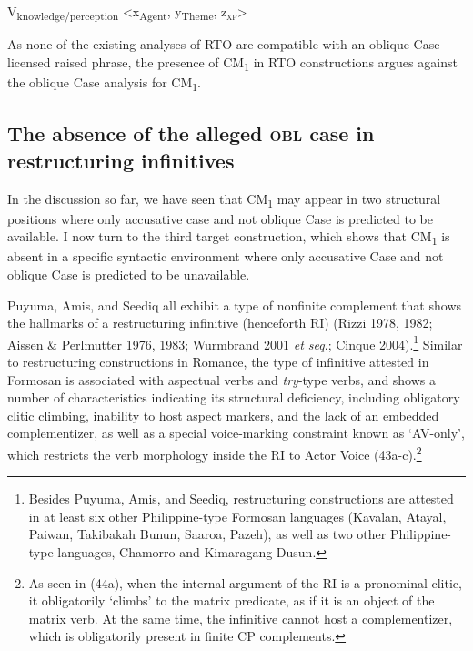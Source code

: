 \documentclass[10pt]{article}
\begin{document}
\begin{exe}
\ex V\textsubscript{knowledge/perception} <x\textsubscript{Agent}, y\textsubscript{Theme}, z\textsubscript{\textsc{xp}}>
\end{exe}

As none of the existing analyses of RTO are compatible with an oblique Case-licensed raised phrase, the presence of CM\textsubscript{1} in RTO constructions argues against the oblique Case analysis for CM\textsubscript{1}.


\subsection{The absence of the alleged \textsc{obl} case in restructuring infinitives}

\noindent In the discussion so far, we have seen that CM\textsubscript{1} may appear in two structural positions where only accusative case and not oblique Case is predicted to be available. I now turn to the third target construction, which shows that CM\textsubscript{1} is absent in a specific syntactic environment where only accusative Case and not oblique Case is predicted to be unavailable.

Puyuma, Amis, and Seediq all exhibit a type of nonfinite complement that shows the hallmarks of a restructuring infinitive (henceforth RI) (Rizzi 1978, 1982; Aissen \& Perlmutter 1976, 1983; Wurmbrand 2001 \textit{et seq}.; Cinque 2004).\footnote{Besides Puyuma, Amis, and Seediq, restructuring constructions are attested in at least six other Philippine-type Formosan languages (Kavalan, Atayal, Paiwan, Takibakah Bunun, Saaroa, Pazeh), as well as two other Philippine-type languages, Chamorro and Kimaragang Dusun.} Similar to restructuring constructions in Romance, the type of infinitive attested in Formosan is associated with aspectual verbs and \textit{try}-type verbs, and shows a number of characteristics indicating its structural deficiency, including obligatory clitic climbing, inability to host aspect markers, and the lack of an embedded complementizer, as well as a special voice-marking constraint known as `AV-only', which restricts the verb morphology inside the RI to Actor Voice (43a-c).\footnote{As seen in (44a), when the internal argument of the RI is a pronominal clitic, it obligatorily `climbs' to the matrix predicate, as if it is an object of the matrix verb. At the same time, the infinitive cannot host a complementizer, which is obligatorily present in finite CP complements.}
\end{document}

